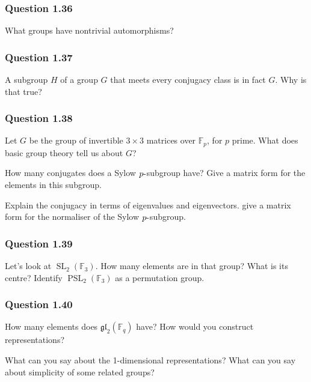 \hypertarget{question-1.36}{%
\subsubsection{Question 1.36}\label{question-1.36}}

What groups have nontrivial automorphisms?

\hypertarget{question-1.37}{%
\subsubsection{Question 1.37}\label{question-1.37}}

A subgroup \(H\) of a group \(G\) that meets every conjugacy class is in
fact \(G\). Why is that true?

\hypertarget{question-1.38}{%
\subsubsection{Question 1.38}\label{question-1.38}}

Let \(G\) be the group of invertible \(3\times 3\) matrices over
\({\mathbb{F}}_p\), for \(p\) prime. What does basic group theory tell
us about \(G\)?

How many conjugates does a Sylow \(p{\hbox{-}}\)subgroup have? Give a
matrix form for the elements in this subgroup.

Explain the conjugacy in terms of eigenvalues and eigenvectors. give a
matrix form for the normaliser of the Sylow \(p{\hbox{-}}\)subgroup.

\hypertarget{question-1.39}{%
\subsubsection{Question 1.39}\label{question-1.39}}

Let's look at \({\operatorname{SL}}_2({\mathbb{F}}_3)\). How many
elements are in that group? What is its centre? Identify
\({\operatorname{PSL}}_2({\mathbb{F}}_3)\) as a permutation group.

\hypertarget{question-1.40}{%
\subsubsection{Question 1.40}\label{question-1.40}}

How many elements does \({\mathfrak{gl}}_2({\mathbb{F}}_q)\) have? How
would you construct representations?

What can you say about the 1-dimensional representations? What can you
say about simplicity of some related groups?

